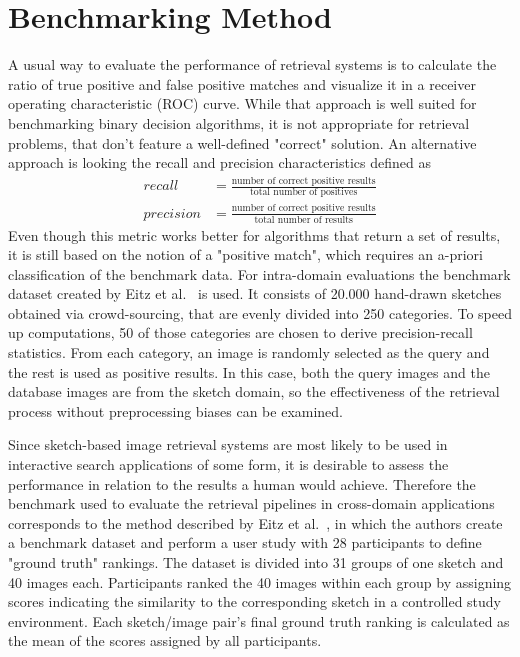 \section{Benchmarking Method}\label{sec:results_benchmarking}

A usual way to evaluate the performance of retrieval systems is to calculate
the ratio of true positive and false positive matches and visualize it in a
receiver operating characteristic (ROC) curve. While that approach is well
suited for benchmarking binary decision algorithms, it is not appropriate for
retrieval problems, that don't feature a well-defined "correct" solution. An
alternative approach is looking the recall and precision characteristics
defined as
\begin{align*}
    recall & = \frac{\text{number of correct positive results}}{\text{total number of positives}} \\
    precision & = \frac{\text{number of correct positive results}}{\text{total number of results}}
\end{align*}
Even though this metric works better for algorithms that return a set of
results, it is still based on the notion of a "positive match", which requires
an a-priori classification of the benchmark data. For intra-domain evaluations
the benchmark dataset created by Eitz et al.\ \autocite{eitz_how_2012} is used.
It consists of 20.000 hand-drawn sketches obtained via crowd-sourcing, that are
evenly divided into 250 categories. To speed up computations, 50 of those
categories are chosen to derive precision-recall statistics. From each
category, an image is randomly selected as the query and the rest is used as
positive results. In this case, both the query images and the database images
are from the sketch domain, so the effectiveness of the retrieval process
without preprocessing biases can be examined.

Since sketch-based image retrieval systems are most likely to be used in
interactive search applications of some form, it is desirable to assess the
performance in relation to the results a human would achieve.  Therefore the
benchmark used to evaluate the retrieval pipelines in cross-domain applications
corresponds to the method described by Eitz et al.\
\autocite{eitz_sketch-based_2010}, in which the authors create a benchmark
dataset and perform a user study with 28 participants to define "ground truth"
rankings. The dataset is divided into 31 groups of one sketch and 40 images
each. Participants ranked the 40 images within each group by assigning scores
indicating the similarity to the corresponding sketch in a controlled study
environment. Each sketch/image pair's final ground truth ranking is calculated
as the mean of the scores assigned by all participants.

